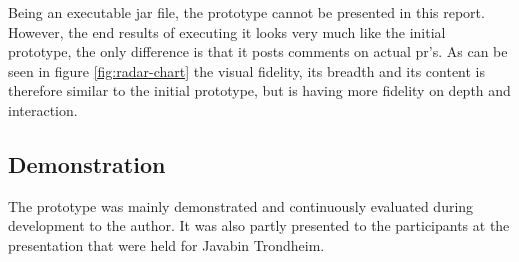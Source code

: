 \documentclass{report}
\begin{document}
Being an executable jar file, the prototype cannot be presented in this report. However, the end results of executing it looks very much like the initial prototype, the only difference is that it posts comments on actual \gls{pr}'s. As can be seen in figure \ref{fig:radar-chart} the visual fidelity, its breadth and its content is therefore similar to the initial prototype, but is having more fidelity on depth and interaction.  

\subsection*{Demonstration}
The prototype was mainly demonstrated and continuously evaluated during development to the author. It was also partly presented to the participants at the presentation that were held for Javabin Trondheim.
\end{document}
